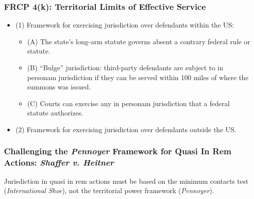 \subsubsection{FRCP 4(k): Territorial Limits of Effective Service}

\begin{itemize} %
    \item (1) Framework for exercising jurisdiction over defendants within the 
    US: %
    \begin{itemize}
        \item (A) The state's long-arm statute governs absent a contrary 
        federal rule or statute.
        \item (B) ``Bulge'' jurisdiction: third-party defendants are subject 
        to in personam jurisdiction if they can be served within 100 miles of 
        where the summons was issued.
        \item (C) Courts can exercise any in personam jurisdiction that a 
        federal statute authorizes.
    \end{itemize}
    \item (2) Framework for exercising jurisdiction over defendants outside 
    the US.
\end{itemize}

\subsubsection{Challenging the \emph{Pennoyer} Framework for Quasi In Rem Actions: \emph{Shaffer v.  
Heitner}}
Jurisdiction in quasi in rem actions must be based on the minimum
contacts test (\emph{International Shoe}), not the territorial power
framework (\emph{Pennoyer}).

